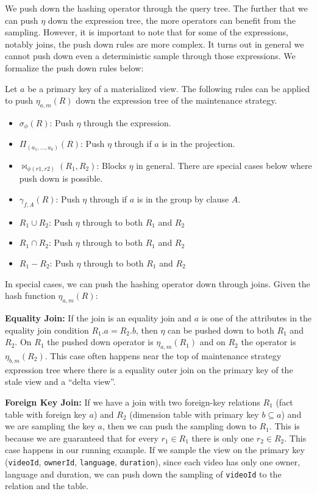 We push down the hashing operator through the query tree.
The further that we can push $\eta$ down the expression tree, the more operators can benefit from the sampling.
However, it is important to note that for some of the expressions, notably joins, the push down rules are more complex. 
It turns out in general we cannot push down even a deterministic sample through those expressions.
We formalize the push down rules below:
\begin{definition}
Let $a$ be a primary key of a materialized view. The following rules can be applied to push $\eta_{a, m}(R)$ down the expression tree of the maintenance strategy. 
\begin{itemize}[noitemsep]
\item $\sigma_{\phi}(R)$: Push $\eta$ through the expression.  
\item $\Pi_{(a_1,...,a_k)}(R)$: Push $\eta $ through if $a$ is in the projection.
\item $\bowtie_{\phi (r1,r2)}(R_1,R_2)$: Blocks $\eta $ in general. There are special cases below where push down is possible.
\item $\gamma_{f,A}(R)$: Push $\eta $ through if $a$ is in the group by clause $A$.
\item $R_1 \cup R_2$: Push $\eta $ through to both $R_1$ and $R_2$
\item $R_1 \cap R_2$: Push $\eta $ through to both $R_1$ and $R_2$
\item $R_1 - R_2$: Push $\eta $ through to both $R_1$ and $R_2$
\end{itemize}
\end{definition}
In special cases, we can push the hashing operator down through joins. 
Given the hash function $\eta_{a, m}(R)$:
\vspace{.25em}

{\noindent \textbf{Equality Join:}} If the join is an equality join and $a$ is one of the attributes in the equality join condition $R_1.a = R_2.b$, then $\eta$ can be pushed down to both $R_1$ and $R_2$. On $R_1$ the pushed down operator is $\eta_{a, m}(R_1)$ and on $R_2$ the operator is $\eta_{b, m}(R_2)$. This case often happens near the top of maintenance strategy expression tree where there is a equality outer join on the primary key of the stale view and a ``delta view''.

\vspace{.25em}

{\noindent \textbf{Foreign Key Join:}} If we have a join with two foreign-key relations $R_1$ (fact table with foreign key $a$) and $R_2$ (dimension table with primary key $b \subseteq a$) and we are sampling the key $a$, then we can push the sampling down to $R_1$. This is because we are guaranteed that for every $r_1\in R_1$ there is only one $r_2 \in R_2$. This case happens in our running example. If we sample the view on the primary key (\texttt{videoId}, \texttt{ownerId}, \texttt{language}, \texttt{duration}), since each video has only one owner, language and duration, we can push down the sampling of \texttt{videoId} to the  relation and the  table.

